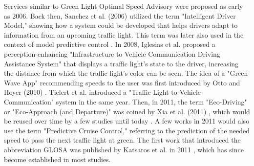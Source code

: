 Services similar to Green Light Optimal Speed Advisory were proposed as early as 2006. Back then, Sanchez et al. (2006) \cite{sanchez_predicting_2006} utilized the term "Intelligent Driver Model," showing how a system could be developed that helps drivers adapt to information from an upcoming traffic light. This term was later also used in the context of model predictive control \cite{xin_predictive_2018}. In 2008, Iglesias et al. \cite{iglesias_i2v_2008} proposed a perception-enhancing "Infrastructure to Vehicle Communication Driving Assistance System" that displays a traffic light's state to the driver, increasing the distance from which the traffic light's color can be seen. The idea of a "Green Wave App" recommending speeds to the user was first introduced by Otto and Hoyer (2010) \cite{otto_operating_2010}. Tielert et al. \cite{tielert_impact_2010} introduced a "Traffic-Light-to-Vehicle-Communication" system in the same year. Then, in 2011, the term "Eco-Driving" or "Eco-Approach (and Departure)" was coined by Xia et al. (2011) \cite{xia_indirect_2011}, which would be reused over time by a few studies until today \cite{rakha_eco-driving_2011, rakha_aeris_2012, xia_field_2012, hao_eco-approach_2019, hu_lane-level_2023}. A few works in 2011 \cite{asadi_predictive_2011, raubitschek_predictive_2011} would also use the term "Predictive Cruise Control," referring to the prediction of the needed speed to pass the next traffic light at green. The first work that introduced the abbreviation GLOSA was published by Katsaros et al. in 2011 \cite{katsaros_performance_2011}, which has since become established in most studies.

